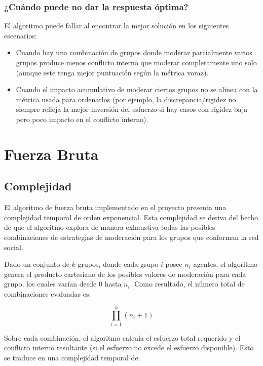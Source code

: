 \subsubsection{¿Cuándo puede no dar la respuesta óptima?}

El algoritmo puede fallar al encontrar la mejor solución en los siguientes escenarios:

\begin{itemize}
	\item Cuando hay una combinación de grupos donde moderar parcialmente varios grupos produce menos conflicto interno que moderar completamente uno solo (aunque este tenga mejor puntuación según la métrica voraz).

	\item Cuando el impacto acumulativo de moderar ciertos grupos no se alinea con la métrica usada para ordenarlos (por ejemplo, la discrepancia/rigidez no siempre refleja la mejor inversión del esfuerzo si hay casos con rigidez baja pero poco impacto en el conflicto interno).
\end{itemize}

\section{Fuerza Bruta}

\subsection{Complejidad}

El algoritmo de fuerza bruta implementado en el proyecto presenta una complejidad temporal de orden exponencial. Esta complejidad se deriva del hecho de que el algoritmo explora de manera exhaustiva todas las posibles combinaciones de estrategias de moderación para los grupos que conforman la red social.

Dado un conjunto de $k$ grupos, donde cada grupo $i$ posee $n_i$ agentes, el algoritmo genera el producto cartesiano de los posibles valores de moderación para cada grupo, los cuales varían desde $0$ hasta $n_i$. Como resultado, el número total de combinaciones evaluadas es:

\begin{equation}
	\prod_{ i = 1 }^k (n_i + 1)
\end{equation}

Sobre cada combinación, el algoritmo calcula el esfuerzo total requerido y el conflicto interno resultante (si el esfuerzo no excede el esfuerzo disponible). Esto se traduce en una complejidad temporal de:


